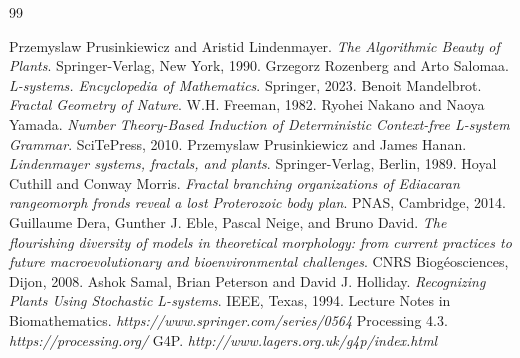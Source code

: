 \documentclass[]{interim_report}
\begin{document}
\newpage
\begin{thebibliography}{99}
 Przemyslaw Prusinkiewicz and Aristid Lindenmayer. \emph{The Algorithmic Beauty of Plants}.  Springer-Verlag, New York, 1990.
 Grzegorz Rozenberg and Arto Salomaa. \emph{L-systems. Encyclopedia of Mathematics}. Springer, 2023.
 Benoit Mandelbrot. \emph{Fractal Geometry of Nature}. W.H. Freeman, 1982.
 Ryohei Nakano and Naoya Yamada. \emph{Number Theory-Based Induction of Deterministic Context-free L-system Grammar}. SciTePress, 2010.
 Przemyslaw Prusinkiewicz and James Hanan. \emph{Lindenmayer systems, fractals, and plants}. Springer-Verlag, Berlin, 1989.
 Hoyal Cuthill and Conway Morris. \emph{Fractal branching organizations of Ediacaran rangeomorph fronds reveal a lost Proterozoic body plan}. PNAS, Cambridge, 2014.
 Guillaume Dera, Gunther J. Eble, Pascal Neige, and Bruno David. \emph{ The flourishing diversity of models in theoretical morphology: from current practices to future macroevolutionary and bioenvironmental challenges}. CNRS Biogéosciences, Dijon, 2008.
 Ashok Samal, Brian Peterson and David J. Holliday. \emph{Recognizing Plants Using Stochastic L-systems}. IEEE, Texas, 1994.
 Lecture Notes in Biomathematics. \emph{https://www.springer.com/series/0564}
 Processing 4.3. \emph{https://processing.org/}
 G4P. \emph{http://www.lagers.org.uk/g4p/index.html}
\end{thebibliography}
\label{endpage}
\end{document}
